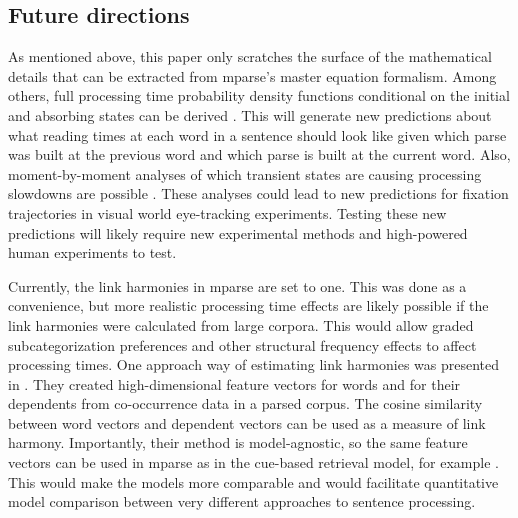 \documentclass[a4paper, 12pt]{article}
\begin{document}
\subsection{Future directions}
As mentioned above, this paper only scratches the surface of the mathematical
details that can be extracted from mparse's master equation formalism. Among
others, full processing time probability density functions conditional on the
initial and absorbing states can be derived \citep{iyer-biswas2016first,
    polizzi2016mean, valleriani2008dwell, valleriani2014unveiling}. This will
generate new predictions about what reading times at each word in a sentence
should look like given which parse was built at the previous word and which
parse is built at the current word. Also, moment-by-moment analyses of which
transient states are causing processing slowdowns are possible
\citep{miller1999structural, lu2005kinetics}. These analyses could lead to new
predictions for fixation trajectories in visual world eye-tracking experiments.
Testing these new predictions will likely require new experimental methods and
high-powered human experiments to test.


Currently, the link harmonies in mparse are set to one. This was done as a
convenience, but more realistic processing time effects are likely possible if
the link harmonies were calculated from large corpora. This would allow graded
subcategorization preferences and other structural frequency effects to affect
processing times. One approach way of estimating link harmonies was presented
in \cite{smith2020principled}. They created high-dimensional feature vectors
for words and for their dependents from co-occurrence data in a parsed corpus.
The cosine similarity between word vectors and dependent vectors can be used as
a measure of link harmony.  Importantly, their method is model-agnostic, so the
same feature vectors can be used in mparse as in the cue-based retrieval model,
for example \citep{lewis2005activation, vasishth2019computational,
    engelmann2019effect}. This would
make the models more comparable and would facilitate quantitative model
comparison between very different approaches to sentence processing.
\end{document}

